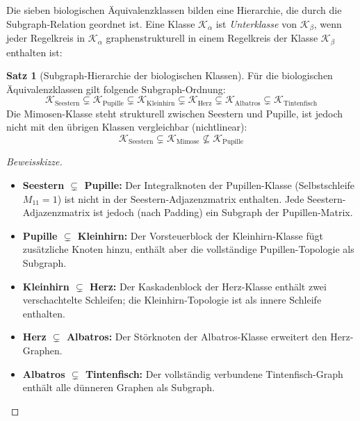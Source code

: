 \documentclass[a4paper,12pt]{article}
\theoremstyle{definition}
\newtheorem{satz}{Satz}
\begin{document}
Die sieben biologischen Äquivalenzklassen bilden eine Hierarchie, die durch die
Subgraph-Relation geordnet ist. Eine Klasse $\mathcal{K}_\alpha$ ist
\emph{Unterklasse} von $\mathcal{K}_\beta$, wenn jeder Regelkreis in
$\mathcal{K}_\alpha$ graphenstrukturell in einem Regelkreis der Klasse
$\mathcal{K}_\beta$ enthalten ist:

\begin{satz}[Subgraph-Hierarchie der biologischen Klassen]
	\label{satz:bio_hierarchie}
	Für die biologischen Äquivalenz\-klassen gilt folgende Subgraph-Ordnung:
	\[
	\mathcal{K}_{\text{Seestern}} \subsetneq \mathcal{K}_{\text{Pupille}}
	\subsetneq \mathcal{K}_{\text{Kleinhirn}} \subsetneq \mathcal{K}_{\text{Herz}}
	\subsetneq \mathcal{K}_{\text{Albatros}} \subsetneq \mathcal{K}_{\text{Tintenfisch}}
	\]
	Die Mimosen-Klasse steht strukturell zwischen Seestern und Pupille, ist jedoch
	nicht mit den übrigen Klassen vergleichbar (nichtlinear):
	\[
	\mathcal{K}_{\text{Seestern}} \subsetneq \mathcal{K}_{\text{Mimose}} \not\subseteq \mathcal{K}_{\text{Pupille}}
	\]
\end{satz}

\begin{proof}[Beweisskizze]
	\begin{itemize}
		\item \textbf{Seestern $\subsetneq$ Pupille:} Der Integralknoten der
		Pupillen-Klasse (Selbstschleife $M_{11}=1$) ist nicht in der
		Seestern-Adjazenzmatrix enthalten. Jede Seestern-Adjazenzmatrix
		ist jedoch (nach Padding) ein Subgraph der Pupillen-Matrix.
		\item \textbf{Pupille $\subsetneq$ Kleinhirn:} Der Vorsteuerblock der
		Kleinhirn-Klasse fügt zusätzliche Knoten hinzu, enthält aber
		die vollständige Pupillen-Topologie als Subgraph.
		\item \textbf{Kleinhirn $\subsetneq$ Herz:} Der Kaskadenblock der Herz-Klasse
		enthält zwei verschachtelte Schleifen; die Kleinhirn-Topologie
		ist als innere Schleife enthalten.
		\item \textbf{Herz $\subsetneq$ Albatros:} Der Störknoten der Albatros-Klasse
		erweitert den Herz-Graphen.
		\item \textbf{Albatros $\subsetneq$ Tintenfisch:} Der vollständig verbundene
		Tintenfisch-Graph enthält alle dünneren Graphen als Subgraph.
	\end{itemize}
\end{proof}
\end{document}
